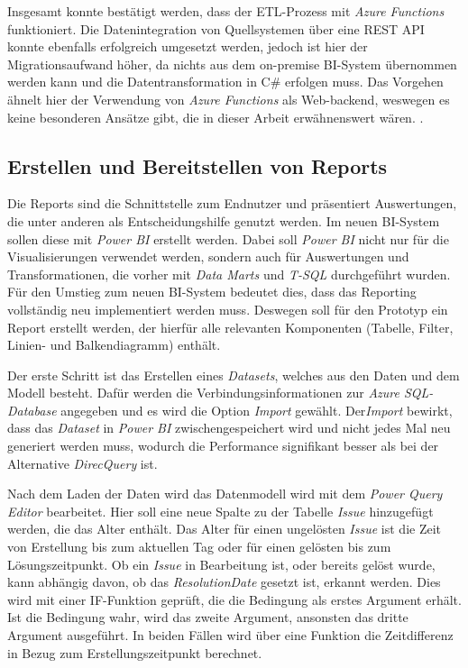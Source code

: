 Insgesamt konnte bestätigt werden, dass der ETL-Prozess mit \textit{Azure Functions} funktioniert. Die Datenintegration von Quellsystemen über eine REST API konnte ebenfalls erfolgreich umgesetzt werden, jedoch ist hier der Migrationsaufwand höher, da nichts aus dem on-premise BI-System übernommen werden kann und die Datentransformation in C\# erfolgen muss. Das Vorgehen ähnelt hier der Verwendung von \textit{Azure Functions} als Web-backend, weswegen es keine besonderen Ansätze gibt, die in dieser Arbeit erwähnenswert wären. 
\cite[vgl.][]{kurniawan_practical_2019, satapathi_hands-azure_2021, sreeram_azure_2020}.

\subsection{Erstellen und Bereitstellen von Reports}
Die Reports sind die Schnittstelle zum Endnutzer und präsentiert Auswertungen, die unter anderen als Entscheidungshilfe genutzt werden. Im neuen BI-System sollen diese mit \textit{Power BI} erstellt werden. Dabei soll \textit{Power BI} nicht nur für die Visualisierungen verwendet werden, sondern auch für Auswertungen und Transformationen, die vorher mit \textit{Data Marts} und \textit{T-SQL} durchgeführt wurden. Für den Umstieg zum neuen BI-System bedeutet dies, dass das Reporting vollständig neu implementiert werden muss. Deswegen soll für den Prototyp ein Report erstellt werden, der hierfür alle relevanten Komponenten (Tabelle, Filter, Linien- und Balkendiagramm) enthält.

Der erste Schritt ist das Erstellen eines \textit{Datasets}, welches aus den Daten und dem Modell besteht. Dafür werden die Verbindungsinformationen zur \textit{Azure SQL-Database} angegeben und es wird die Option \textit{Import} gewählt. Der\textit{Import} bewirkt, dass das \textit{Dataset} in \textit{Power BI} zwischengespeichert wird und nicht jedes Mal neu generiert werden muss, wodurch die Performance signifikant besser als bei der Alternative \textit{DirecQuery} ist.

Nach dem Laden der Daten wird das Datenmodell wird mit dem \textit{Power Query Editor} bearbeitet. Hier soll eine neue Spalte zu der Tabelle \textit{Issue} hinzugefügt werden, die das Alter enthält. Das Alter für einen ungelösten \textit{Issue} ist die Zeit von Erstellung bis zum aktuellen Tag oder für einen gelösten bis zum Lösungszeitpunkt. Ob ein \textit{Issue} in Bearbeitung ist, oder bereits gelöst wurde, kann abhängig davon, ob das \textit{ResolutionDate} gesetzt ist, erkannt werden. Dies wird mit einer IF-Funktion geprüft, die die Bedingung als erstes Argument erhält. Ist die Bedingung wahr, wird das zweite Argument, ansonsten das dritte Argument ausgeführt. In beiden Fällen wird über eine Funktion die Zeitdifferenz in Bezug zum Erstellungszeitpunkt berechnet.

